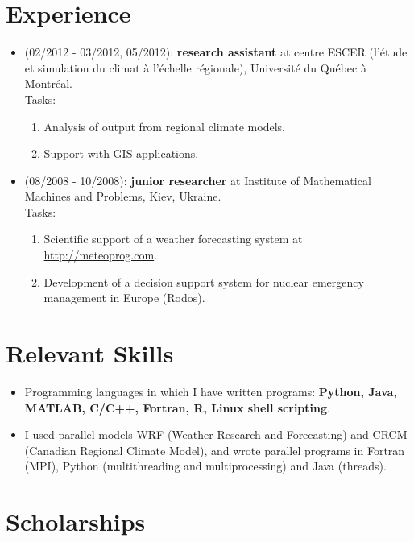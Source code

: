 \documentclass[12pt,a4paper,sans]{moderncv}
\begin{document}
\section*{Experience}
\begin{itemize}
  
  \item (02/2012 - 03/2012, 05/2012):
  \textbf{research assistant} at centre ESCER (l'étude et simulation du climat à
  l'échelle régionale), Université du Québec à Montréal.\\
  Tasks:
  \begin{enumerate}
    \item Analysis of output from regional climate models.
    \item Support with GIS applications.
  \end{enumerate}

  \item (08/2008 - 10/2008): 
   \textbf{junior researcher} at Institute of Mathematical
  Machines and Problems, Kiev, Ukraine. \\
  Tasks:
  \begin{enumerate}
    \item Scientific support of a weather forecasting system at
    \href{http://meteoprog.com}{http://meteoprog.com}.
    \item Development of a decision support system for nuclear emergency
    management in Europe (Rodos).
  \end{enumerate}
\end{itemize}

\section*{Relevant Skills}
\begin{itemize}  
  \item Programming languages in which I have written programs: \textbf{ Python,
  Java, MATLAB, C/C++, Fortran, R, Linux shell scripting}. 
  \item I used parallel models WRF (Weather Research and Forecasting) and CRCM
  (Canadian Regional Climate Model), and wrote parallel programs in Fortran
  (MPI), Python (multithreading and multiprocessing) and Java (threads).
\end{itemize}


\section*{Scholarships}
\end{document}
